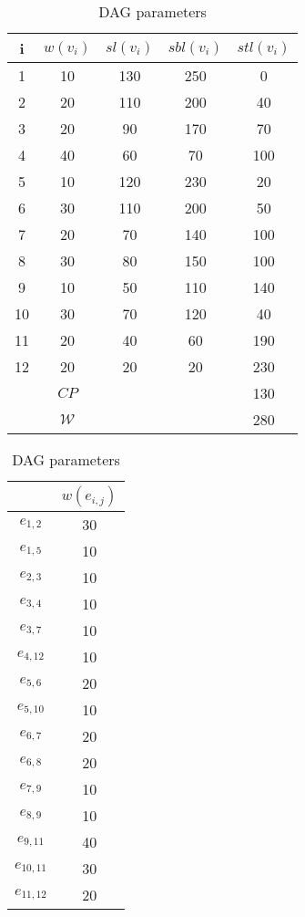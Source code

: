 \begin{table}[h]
  \centering
  \begin{subtable}[t]{0.55\linewidth}
  \centering
    \begin{tabular}[h]{c | c c c c }
      i     & $w(v_i)$ & $sl(v_i)$ & $sbl(v_i)$ & $stl(v_i)$ \\\hline
      1     & 10 & 130 & 250 & 0    \\
      2     & 20 & 110 & 200 & 40   \\
      3     & 20 & 90  & 170 & 70   \\
      4     & 40 & 60  & 70  & 100  \\
      5     & 10 & 120 & 230 & 20   \\
      6     & 30 & 110 & 200 & 50   \\
      7     & 20 & 70  & 140 & 100  \\
      8     & 30 & 80  & 150 & 100  \\
      9     & 10 & 50  & 110 & 140  \\
      10    & 30 & 70  & 120 & 40   \\
      11    & 20 & 40  & 60  & 190  \\
      12    & 20 & 20  & 20  & 230  \\\hline\hline
            &$CP$      &&     & 130 \\
            &$\mathcal{W}$ && & 280
    \end{tabular}
    \caption{Node parameters}
    \label{tab:node_params}
  \end{subtable}
  \begin{subtable}[t]{0.35\linewidth}
  \centering
    \begin{tabular}[h]{c | c  }
                & $w(e_{i,j})$ \\\hline
      $e_{1,2}$  & 30 \\
      $e_{1,5}$  & 10 \\
      $e_{2,3}$  & 10 \\
      $e_{3,4}$  & 10 \\
      $e_{3,7}$  & 10 \\
      $e_{4,12}$ & 10 \\
      $e_{5,6}$  & 20 \\
      $e_{5,10}$ & 10 \\
      $e_{6,7}$  & 20 \\
      $e_{6,8}$  & 20 \\
      $e_{7,9}$  & 10 \\
      $e_{8,9}$  & 10 \\
      $e_{9,11}$ & 40 \\
      $e_{10,11}$& 30 \\
      $e_{11,12}$& 20 \\
    \end{tabular}
    \caption{Edge parameters}
    \label{tab:edge_params}
  \end{subtable}
  \caption{DAG parameters}
  \label{tab:dag_params}
\end{table}

